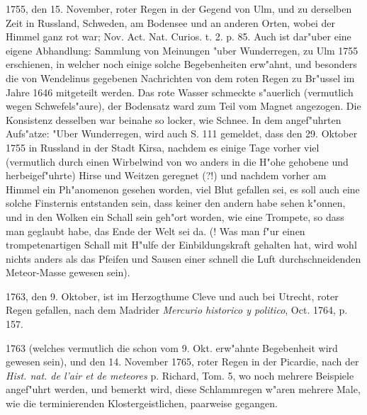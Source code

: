 \documentclass[a4paper, 11pt, oneside, polutonikogreek, german]{article}
\begin{document}
1755, den 15. November, roter Regen in der Gegend von Ulm, und zu derselben Zeit in Russland, Schweden, am Bodensee und an anderen Orten, wobei der Himmel ganz rot war; Nov. Act. Nat. Curios. t. 2. p. 85. Auch ist dar"uber eine eigene Abhandlung: Sammlung von Meinungen "uber Wunderregen, zu Ulm 1755 erschienen, in welcher noch einige solche Begebenheiten erw"ahnt, und besonders die von Wendelinus gegebenen Nachrichten von dem roten Regen zu Br"ussel im Jahre 1646 mitgeteilt werden. Das rote Wasser schmeckte s"auerlich (vermutlich wegen Schwefels"aure), der Bodensatz ward zum Teil vom Magnet angezogen. Die Konsistenz desselben war beinahe so locker, wie Schnee. In dem angef"uhrten Aufs"atze: "Uber Wunderregen, wird auch S. 111 gemeldet, dass den 29. Oktober 1755 in Russland in der Stadt Kirsa, nachdem es einige Tage vorher viel (vermutlich durch einen Wirbelwind von wo anders in die H"ohe gehobene und herbeigef"uhrte) Hirse und Weitzen geregnet (?!) und nachdem vorher am Himmel ein Ph"anomenon gesehen worden, viel Blut gefallen sei, es soll auch eine solche Finsternis entstanden sein, dass keiner den andern habe sehen k"onnen, und in den Wolken ein Schall sein geh"ort worden, wie eine Trompete, so dass man geglaubt habe, das Ende der Welt sei da. (! Was man f"ur einen trompetenartigen Schall mit H"ulfe der Einbildungskraft gehalten hat, wird wohl nichts anders als das Pfeifen und Sausen einer schnell die Luft durchschneidenden Meteor-Masse gewesen sein).

1763, den 9. Oktober, ist im Herzogthume Cleve und auch bei Utrecht, roter Regen gefallen, nach dem Madrider \emph{Mercurio historico y politico}, Oct. 1764, p. 157.

1763 (welches vermutlich die schon vom 9. Okt. erw"ahnte Begebenheit wird gewesen sein), und den 14. November 1765, roter Regen in der Picardie, nach der \emph{Hist. nat. de l'air et de meteores} p. Richard, Tom. 5, wo noch mehrere Beispiele angef"uhrt werden, und bemerkt wird, diese Schlammregen w"aren mehrere Male, wie die terminierenden Klostergeistlichen, paarweise gegangen.
\end{document}
